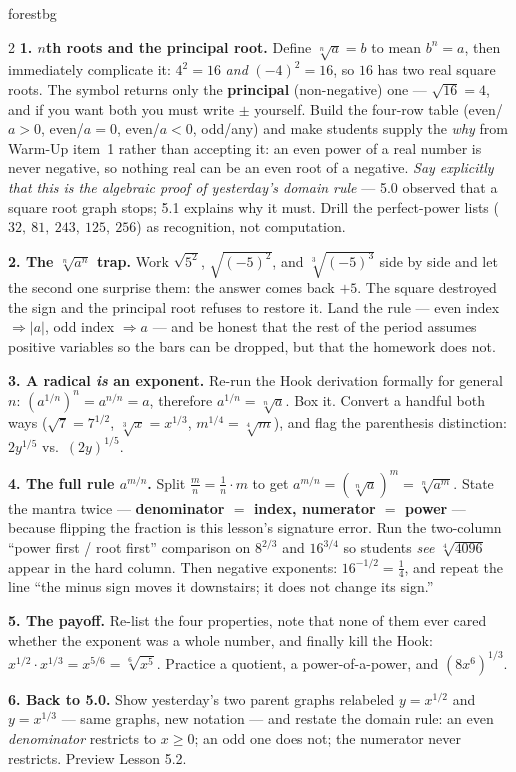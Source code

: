 \documentclass[10pt]{article}
\begin{document}
\begin{skillbox}[Lesson]{forestbg}
\begin{multicols}{2}
\textbf{1. $n$th roots and the principal root.} Define $\sqrt[n]{a}=b$ to mean $b^{n}=a$, then
immediately complicate it: $4^{2}=16$ \emph{and} $(-4)^{2}=16$, so $16$ has two real square roots.
The symbol returns only the \textbf{principal} (non-negative) one --- $\sqrt{16}=4$, and if you want
both you must write $\pm$ yourself. Build the four-row table (even/$a>0$, even/$a=0$, even/$a<0$,
odd/any) and make students supply the \emph{why} from Warm-Up item~1 rather than accepting it:
an even power of a real number is never negative, so nothing real can be an even root of a negative.
\emph{Say explicitly that this is the algebraic proof of yesterday's domain rule} --- 5.0 observed
that a square root graph stops; 5.1 explains why it must. Drill the perfect-power lists
($32,\ 81,\ 243,\ 125,\ 256$) as recognition, not computation.

\textbf{2. The $\sqrt[n]{a^{n}}$ trap.} Work $\sqrt{5^{2}}$, $\sqrt{(-5)^{2}}$, and
$\sqrt[3]{(-5)^{3}}$ side by side and let the second one surprise them: the answer comes back
$+5$. The square destroyed the sign and the principal root refuses to restore it. Land the rule
--- even index $\Rightarrow |a|$, odd index $\Rightarrow a$ --- and be honest that the rest of the
period assumes positive variables so the bars can be dropped, but that the homework does not.

\columnbreak

\textbf{3. A radical \emph{is} an exponent.} Re-run the Hook derivation formally for general $n$:
$\left(a^{1/n}\right)^{n}=a^{n/n}=a$, therefore $a^{1/n}=\sqrt[n]{a}$. Box it. Convert a handful
both ways ($\sqrt{7}=7^{1/2}$, $\sqrt[3]{x}=x^{1/3}$, $m^{1/4}=\sqrt[4]{m}$), and flag the
parenthesis distinction: $2y^{1/5}$ vs.\ $(2y)^{1/5}$.

\textbf{4. The full rule $a^{m/n}$.} Split $\frac{m}{n}=\frac{1}{n}\cdot m$ to get
$a^{m/n}=\left(\sqrt[n]{a}\right)^{m}=\sqrt[n]{a^{m}}$. State the mantra twice --- \textbf{denominator
$=$ index, numerator $=$ power} --- because flipping the fraction is this lesson's signature error.
Run the two-column ``power first / root first'' comparison on $8^{2/3}$ and $16^{3/4}$ so students
\emph{see} $\sqrt[4]{4096}$ appear in the hard column. Then negative exponents: $16^{-1/2}=\frac14$,
and repeat the line ``the minus sign moves it downstairs; it does not change its sign.''

\textbf{5. The payoff.} Re-list the four properties, note that none of them ever cared whether the
exponent was a whole number, and finally kill the Hook: $x^{1/2}\cdot x^{1/3}=x^{5/6}=\sqrt[6]{x^{5}}$.
Practice a quotient, a power-of-a-power, and $\left(8x^{6}\right)^{1/3}$.

\textbf{6. Back to 5.0.} Show yesterday's two parent graphs relabeled $y=x^{1/2}$ and $y=x^{1/3}$ ---
same graphs, new notation --- and restate the domain rule: an even \emph{denominator} restricts to
$x\ge0$; an odd one does not; the numerator never restricts. Preview Lesson 5.2.
\end{multicols}
\end{skillbox}
\end{document}
